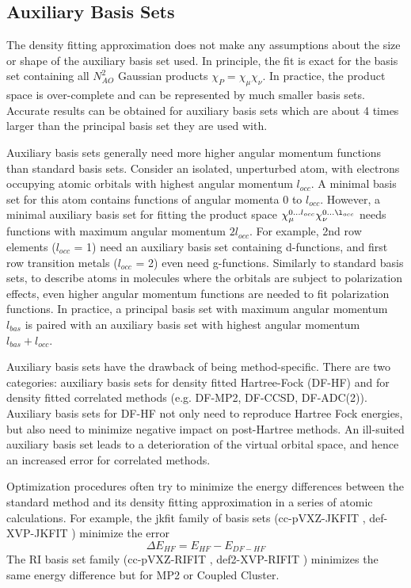 \subsection{Auxiliary Basis Sets}

The density fitting approximation does not make any assumptions about the size or shape of the auxiliary basis set used. In principle, the fit is exact for the basis set containing all $N_{AO}^2$ Gaussian products $\chi_P = \chi_{\mu} \chi_{\nu}$. In practice, the product space is over-complete and can be represented by much smaller basis sets. Accurate results can be obtained for auxiliary basis sets which are about 4 times larger than the principal basis set they are used with. 

Auxiliary basis sets generally need more higher angular momentum functions than standard basis sets. Consider an isolated, unperturbed atom, with electrons occupying atomic orbitals with highest angular momentum $l_{occ}$. A minimal basis set for this atom contains functions of angular momenta 0 to $l_{occ}$. However, a minimal auxiliary basis set for fitting the product space $\chi_{\mu}^{0...l_{occ}} \chi_{\nu}^{0...\l_{occ}}$ needs functions with maximum angular momentum $2l_{occ}$. For example, 2nd row elements ($l_{occ}$ = 1) need an auxiliary basis set containing d-functions, and first row transition metals ($l_{occ}$ = 2) even need g-functions. Similarly to standard basis sets, to describe atoms in molecules where the orbitals are subject to polarization effects, even higher angular momentum functions are needed to fit polarization functions. In practice, a principal basis set with maximum angular momentum $l_{bas}$ is paired with an auxiliary basis set with highest angular momentum $l_{bas} + l_{occ}$. 

Auxiliary basis sets have the drawback of being method-specific. There are two categories: auxiliary basis sets for density fitted Hartree-Fock (DF-HF) and for density fitted correlated methods (e.g. DF-MP2, DF-CCSD, DF-ADC(2)). Auxiliary basis sets for DF-HF not only need to reproduce Hartree Fock energies, but also need to minimize negative impact on post-Hartree methods. An ill-suited auxiliary basis set leads to a deterioration of the virtual orbital space, and hence an increased error for correlated methods. 

Optimization procedures often try to minimize the energy differences between the standard method and its density fitting approximation in a series of atomic calculations. For example, the jkfit family of basis sets (cc-pVXZ-JKFIT \cite{Wei2002}, def-XVP-JKFIT \cite{Wei2007}) minimize the error
\begin{equation}
\Delta E_{HF} = E_{HF} - E_{DF-HF}
\end{equation}
The RI basis set family (cc-pVXZ-RIFIT \cite{Wei1998}, def2-XVP-RIFIT \cite{Ber1998}) minimizes the same energy difference but for MP2 or Coupled Cluster. 


